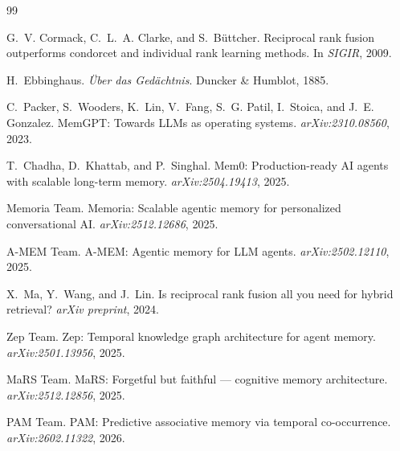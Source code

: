 \documentclass[11pt,a4paper]{article}
\begin{document}
\begin{thebibliography}{99}

G.~V. Cormack, C.~L.~A. Clarke, and S.~B{\"u}ttcher.
\newblock Reciprocal rank fusion outperforms condorcet and individual
  rank learning methods.
\newblock In \emph{SIGIR}, 2009.

H.~Ebbinghaus.
\newblock \emph{{\"U}ber das Ged{\"a}chtnis}.
\newblock Duncker \& Humblot, 1885.

C.~Packer, S.~Wooders, K.~Lin, V.~Fang, S.~G. Patil, I.~Stoica, and
  J.~E. Gonzalez.
\newblock MemGPT: Towards {LLM}s as operating systems.
\newblock \emph{arXiv:2310.08560}, 2023.

T.~Chadha, D.~Khattab, and P.~Singhal.
\newblock Mem0: Production-ready {AI} agents with scalable long-term
  memory.
\newblock \emph{arXiv:2504.19413}, 2025.

{Memoria Team}.
\newblock Memoria: Scalable agentic memory for personalized
  conversational {AI}.
\newblock \emph{arXiv:2512.12686}, 2025.

{A-MEM Team}.
\newblock A-{MEM}: Agentic memory for {LLM} agents.
\newblock \emph{arXiv:2502.12110}, 2025.

X.~Ma, Y.~Wang, and J.~Lin.
\newblock Is reciprocal rank fusion all you need for hybrid retrieval?
\newblock \emph{arXiv preprint}, 2024.

{Zep Team}.
\newblock Zep: Temporal knowledge graph architecture for agent memory.
\newblock \emph{arXiv:2501.13956}, 2025.

{MaRS Team}.
\newblock MaRS: Forgetful but faithful --- cognitive memory
  architecture.
\newblock \emph{arXiv:2512.12856}, 2025.

{PAM Team}.
\newblock PAM: Predictive associative memory via temporal
  co-occurrence.
\newblock \emph{arXiv:2602.11322}, 2026.

\end{thebibliography}
\end{document}
